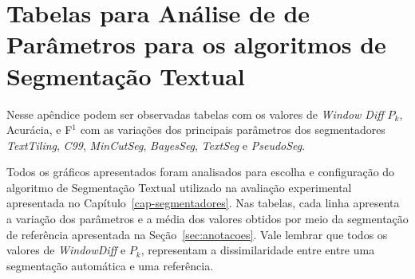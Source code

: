 \chapter{ Tabelas para Análise de de Parâmetros para os algoritmos de Segmentação Textual }\label{apendice1}


Nesse apêndice podem ser observadas tabelas com os valores de \textit{Window Diff} $P_k$, Acurácia, e F$^1$ com as variações dos principais parâmetros dos segmentadores \textit{TextTiling}, \textit{C99}, \textit{MinCutSeg}, \textit{BayesSeg}, \textit{TextSeg} e \textit{PseudoSeg}.

Todos os gráficos apresentados foram analisados para escolha e configuração do algoritmo de Segmentação Textual utilizado na avaliação experimental apresentada no Capítulo~\ref{cap-segmentadores}. 
Nas tabelas, cada linha apresenta a variação dos parâmetros e a média dos valores obtidos por meio da segmentação de referência apresentada na Seção~\ref{sec:anotacoes}. Vale lembrar que todos os valores de \textit{WindowDiff} e $P_k$, representam a dissimilaridade entre entre uma segmentação automática e uma referência. 

\begin{landscape}%


\newpage

\end{landscape}
